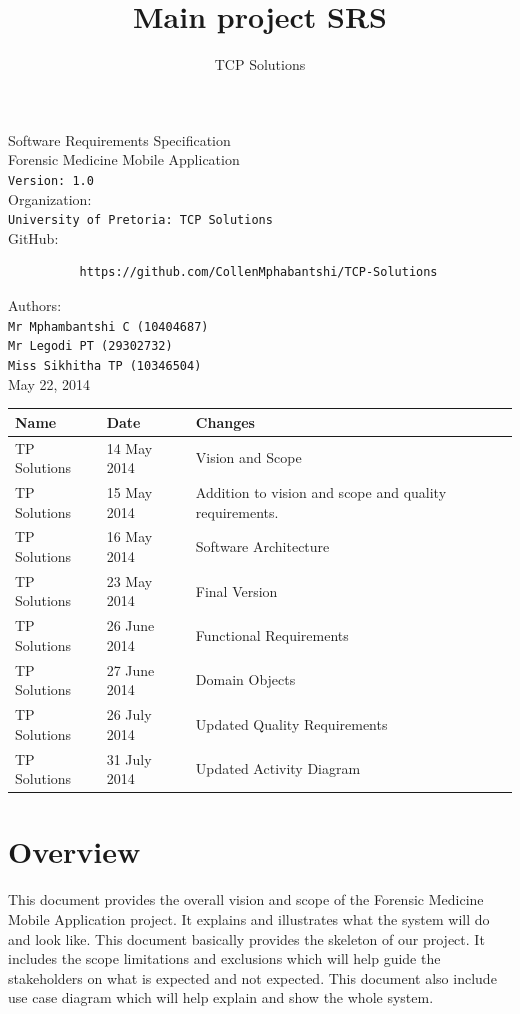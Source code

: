 \documentclass[10pt,a4paper]{article}
\author{TCP Solutions}
\title{Main project SRS}
\begin{document}
\begin{titlepage}
\begin{center}

\huge Software Requirements Specification\\[0.15cm]
\huge Forensic Medicine Mobile Application\\[0.15cm]
\large \texttt{Version: 1.0}\\[1cm]

Organization:\\
\texttt{University of Pretoria: TCP Solutions}\\[0.5cm]
GitHub:\\[0.01cm]

\begin{verbatim}
          https://github.com/CollenMphabantshi/TCP-Solutions
\end{verbatim}

Authors:\\
\texttt{Mr Mphambantshi C (10404687)\\
        Mr Legodi PT (29302732)\\
        Miss Sikhitha TP  (10346504)}\\[1cm]
        
May 22, 2014

\begin{tabular}{|l|l|l|}\hline
Name   & Date	& Changes	\\\hline
TP Solutions	& 14 May 2014	& Vision and Scope\\\hline
TP Solutions	& 15 May 2014	& Addition to vision and scope and quality requirements.\\\hline
TP Solutions	& 16 May 2014	& Software Architecture\\\hline
TP Solutions	& 23 May 2014	& Final Version\\\hline
TP Solutions	& 26 June 2014	& Functional Requirements\\\hline
TP Solutions	& 27 June 2014	& Domain Objects\\\hline
TP Solutions	& 26 July 2014	& Updated Quality Requirements\\\hline
TP Solutions	& 31 July 2014	& Updated Activity Diagram\\\hline
\end{tabular}

\end{center}
\end{titlepage}


\tableofcontents
\pagebreak
\section{Overview}
This document provides the overall vision and scope of the Forensic Medicine Mobile Application project. It explains and illustrates what the system will do and look like. This document basically provides the skeleton of our project. It includes the scope limitations and exclusions which will help guide the stakeholders on what is expected and not expected. This document also include use case diagram which will help explain and show the whole system.
\end{document}
